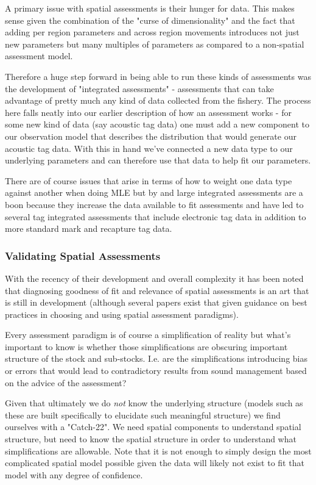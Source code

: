 \documentclass[11pt]{article}
\begin{document}
A primary issue with spatial assessments is their hunger for data. This makes sense given the combination of the "curse of dimensionality" and the fact that adding per region parameters and across region movements introduces not just new parameters but many multiples of parameters as compared to a non-spatial assessment model. 

Therefore a huge step forward in being able to run these kinds of assessments was the development of "integrated assessments" - assessments that can take advantage of pretty much any kind of data collected from the fishery. The process here falls neatly into our earlier description of how an assessment works - for some new kind of data (say acoustic tag data) one must add a new component to our observation model that describes the distribution that would generate our acoustic tag data. With this in hand we've connected a new data type to our underlying parameters and can therefore use that data to help fit our parameters. 

There are of course issues that arise in terms of how to weight one data type against another when doing MLE but by and large integrated assessments are a boon because they increase the data available to fit assessments and have led to several tag integrated assessments that include electronic tag data in addition to more standard mark and recapture tag data. 

\subsubsection{Validating Spatial Assessments}

With the recency of their development and overall complexity it has been noted that diagnosing goodness of fit and relevance of spatial assessments is an art that is still in development (although several papers exist that given guidance on best practices in choosing and using spatial assessment paradigms). 

Every assessment paradigm is of course a simplification of reality but what's important to know is whether those simplifications are obscuring important structure of the stock and sub-stocks. I.e. are the simplifications introducing bias or errors that would lead to contradictory results from sound management based on the advice of the assessment? 

Given that ultimately we do \textit{not} know the underlying structure (models such as these are built specifically to elucidate such meaningful structure) we find ourselves with a "Catch-22". We need spatial components to understand spatial structure, but need to know the spatial structure in order to understand what simplifications are allowable. Note that it is not enough to simply design the most complicated spatial model possible given the data will likely not exist to fit that model with any degree of confidence. 
\end{document}
